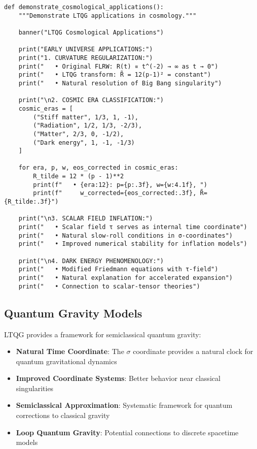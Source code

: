 \documentclass[11pt,a4paper]{article}
\theoremstyle{definition}
\theoremstyle{remark}
\begin{document}
\begin{lstlisting}
def demonstrate_cosmological_applications():
    """Demonstrate LTQG applications in cosmology."""
    
    banner("LTQG Cosmological Applications")
    
    print("EARLY UNIVERSE APPLICATIONS:")
    print("1. CURVATURE REGULARIZATION:")
    print("   • Original FLRW: R(t) ∝ t^(-2) → ∞ as t → 0")
    print("   • LTQG transform: R̃ = 12(p-1)² = constant")
    print("   • Natural resolution of Big Bang singularity")
    
    print("\n2. COSMIC ERA CLASSIFICATION:")
    cosmic_eras = [
        ("Stiff matter", 1/3, 1, -1),
        ("Radiation", 1/2, 1/3, -2/3), 
        ("Matter", 2/3, 0, -1/2),
        ("Dark energy", 1, -1, -1/3)
    ]
    
    for era, p, w, eos_corrected in cosmic_eras:
        R_tilde = 12 * (p - 1)**2
        print(f"   • {era:12}: p={p:.3f}, w={w:4.1f}, ")
        print(f"     w_corrected={eos_corrected:.3f}, R̃={R_tilde:.3f}")
    
    print("\n3. SCALAR FIELD INFLATION:")
    print("   • Scalar field τ serves as internal time coordinate")
    print("   • Natural slow-roll conditions in σ-coordinates")
    print("   • Improved numerical stability for inflation models")
    
    print("\n4. DARK ENERGY PHENOMENOLOGY:")
    print("   • Modified Friedmann equations with τ-field")
    print("   • Natural explanation for accelerated expansion")
    print("   • Connection to scalar-tensor theories")
\end{lstlisting}

\subsection{Quantum Gravity Models}

LTQG provides a framework for semiclassical quantum gravity:

\begin{itemize}
\item \textbf{Natural Time Coordinate}: The $\sigma$ coordinate provides a natural clock for quantum gravitational dynamics
\item \textbf{Improved Coordinate Systems}: Better behavior near classical singularities
\item \textbf{Semiclassical Approximation}: Systematic framework for quantum corrections to classical gravity
\item \textbf{Loop Quantum Gravity}: Potential connections to discrete spacetime models
\end{itemize}
\end{document}
